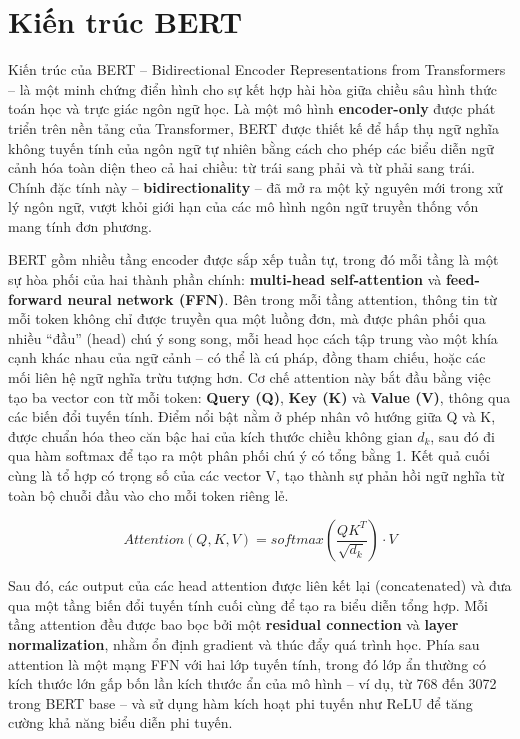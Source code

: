 \section{Kiến trúc BERT}
Kiến trúc của BERT \cite{devlin2019bertpretrainingdeepbidirectional} -- Bidirectional Encoder Representations from Transformers -- là một minh chứng điển hình cho sự kết hợp hài hòa giữa chiều sâu hình thức toán học và trực giác ngôn ngữ học. Là một mô hình \textbf{encoder-only} được phát triển trên nền tảng của Transformer, BERT được thiết kế để hấp thụ ngữ nghĩa không tuyến tính của ngôn ngữ tự nhiên bằng cách cho phép các biểu diễn ngữ cảnh hóa toàn diện theo cả hai chiều: từ trái sang phải và từ phải sang trái. Chính đặc tính này -- \textbf{bidirectionality} -- đã mở ra một kỷ nguyên mới trong xử lý ngôn ngữ, vượt khỏi giới hạn của các mô hình ngôn ngữ truyền thống vốn mang tính đơn phương.

BERT gồm nhiều tầng encoder được sắp xếp tuần tự, trong đó mỗi tầng là một sự hòa phối của hai thành phần chính: \textbf{multi-head self-attention} và \textbf{feed-forward neural network (FFN)}. Bên trong mỗi tầng attention, thông tin từ mỗi token không chỉ được truyền qua một luồng đơn, mà được phân phối qua nhiều ``đầu'' (head) chú ý song song, mỗi head học cách tập trung vào một khía cạnh khác nhau của ngữ cảnh -- có thể là cú pháp, đồng tham chiếu, hoặc các mối liên hệ ngữ nghĩa trừu tượng hơn. Cơ chế attention này bắt đầu bằng việc tạo ba vector con từ mỗi token: \textbf{Query (Q)}, \textbf{Key (K)} và \textbf{Value (V)}, thông qua các biến đổi tuyến tính. Điểm nổi bật nằm ở phép nhân vô hướng giữa Q và K, được chuẩn hóa theo căn bậc hai của kích thước chiều không gian \(d_k\), sau đó đi qua hàm softmax để tạo ra một phân phối chú ý có tổng bằng 1. Kết quả cuối cùng là tổ hợp có trọng số của các vector V, tạo thành sự phản hồi ngữ nghĩa từ toàn bộ chuỗi đầu vào cho mỗi token riêng lẻ. \cite{vaswani2023attentionneed}

\begin{equation}
    Attention(Q, K, V) = softmax\left(\frac{QK^{T}}{\sqrt{d_{k}}}\right) \cdot V
\end{equation}

Sau đó, các output của các head attention được liên kết lại (concatenated) và đưa qua một tầng biến đổi tuyến tính cuối cùng để tạo ra biểu diễn tổng hợp. Mỗi tầng attention đều được bao bọc bởi một \textbf{residual connection} và \textbf{layer normalization}, nhằm ổn định gradient và thúc đẩy quá trình học. Phía sau attention là một mạng FFN với hai lớp tuyến tính, trong đó lớp ẩn thường có kích thước lớn gấp bốn lần kích thước ẩn của mô hình -- ví dụ, từ 768 đến 3072 trong BERT base -- và sử dụng hàm kích hoạt phi tuyến như ReLU để tăng cường khả năng biểu diễn phi tuyến.

